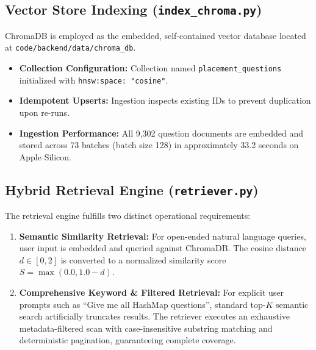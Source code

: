 \documentclass[11pt]{article}
\begin{document}
\subsection{Vector Store Indexing (\texttt{index\_chroma.py})}
ChromaDB is employed as the embedded, self-contained vector database located at \texttt{code/backend/data/chroma\_db}.
\begin{itemize}[leftmargin=1.5em]
    \item \textbf{Collection Configuration:} Collection named \texttt{placement\_questions} initialized with \texttt{hnsw:space: "cosine"}.
    \item \textbf{Idempotent Upserts:} Ingestion inspects existing IDs to prevent duplication upon re-runs.
    \item \textbf{Ingestion Performance:} All 9,302 question documents are embedded and stored across 73 batches (batch size 128) in approximately 33.2 seconds on Apple Silicon.
\end{itemize}

\subsection{Hybrid Retrieval Engine (\texttt{retriever.py})}
The retrieval engine fulfills two distinct operational requirements:
\begin{enumerate}[leftmargin=1.5em]
    \item \textbf{Semantic Similarity Retrieval:} For open-ended natural language queries, user input is embedded and queried against ChromaDB. The cosine distance $d \in [0, 2]$ is converted to a normalized similarity score $S = \max(0.0, 1.0 - d)$.
    \item \textbf{Comprehensive Keyword \& Filtered Retrieval:} For explicit user prompts such as ``Give me all HashMap questions'', standard top-$K$ semantic search artificially truncates results. The retriever executes an exhaustive metadata-filtered scan with case-insensitive substring matching and deterministic pagination, guaranteeing complete coverage.
\end{enumerate}
\end{document}
